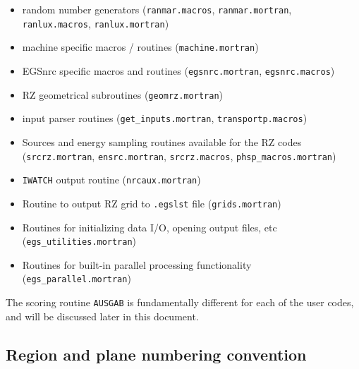\documentclass[12pt,twoside]{article}  %
\begin{document}
\begin{itemize}
\item{random number generators (\verb+ranmar.macros+,
\verb+ranmar.mortran+,\\
\verb+ranlux.macros+, \verb+ranlux.mortran+)}

\item{machine specific macros / routines 
(\verb+machine.mortran+)}

\item{EGSnrc specific macros and routines
(\verb+egsnrc.mortran+, \verb+egsnrc.macros+)}

\item{RZ geometrical subroutines
(\verb+geomrz.mortran+)}

\item{input parser routines
(\verb+get_inputs.mortran+, {\tt transportp.macros})}

\item{Sources and energy sampling routines available for the RZ codes
(\verb+srcrz.mortran+, \verb+ensrc.mortran+, {\tt srcrz.macros},
{\tt phsp\_macros.mortran})}

\item{{\tt IWATCH} output routine
(\verb+nrcaux.mortran+)}

\item{Routine to output RZ grid to {\tt .egslst} file ({\tt grids.mortran})}

\item{Routines for initializing data I/O, opening output files, etc
({\tt egs\_utilities.mortran})}

\item{Routines for built-in parallel processing functionality 
({\tt egs\_parallel.mortran})}

\end{itemize}
The scoring routine \verb+AUSGAB+ is fundamentally different for each
of the user codes, and will be discussed later in this document.

\newpage
\subsection{Region and plane numbering convention}
    
\end{document}
